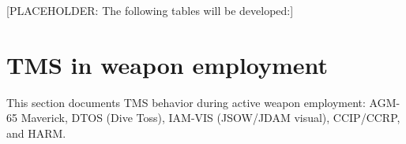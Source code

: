 \documentclass[11pt, a4paper, twoside]{report}
\newenvironment{hotastable}[1]{%
	\footnotesize
	\setlength{\tabcolsep}{3pt}
	\renewcommand{\arraystretch}{1.35}
	\begin{longtable}{L{1.00cm} L{0.90cm} L{0.90cm} L{3.30cm} L{6.40cm} L{1.40cm} L{1.60cm}}
		\caption{#1}\label{table.\thetable}\\
		\noalign{\addtocontents{hotas}{\protect\contentsline{table}{\protect\numberline{\thetable}#1}{\thepage}{table.\thetable}}}%
		\rowcolor{headerblue}
		\multicolumn{1}{>{\centering\arraybackslash}p{1.00cm}}{\textbf{\color{white}Mode}} &
		\multicolumn{1}{>{\centering\arraybackslash}p{0.90cm}}{\textbf{\color{white}Dir.}} &
		\multicolumn{1}{>{\centering\arraybackslash}p{0.90cm}}{\textbf{\color{white}Act.}} &
		\multicolumn{1}{>{\centering\arraybackslash}p{3.30cm}}{\textbf{\color{white}Function}} &
		\multicolumn{1}{>{\centering\arraybackslash}p{6.40cm}}{\textbf{\color{white}Effect / Nuance}} &
		\multicolumn{1}{>{\centering\arraybackslash}p{1.40cm}}{\textbf{\color{white}Dash34}} &
		\multicolumn{1}{>{\centering\arraybackslash}p{1.60cm}}{\textbf{\color{white}Train.}} \\
		\endfirsthead
		\rowcolor{headerblue}
		\multicolumn{1}{>{\centering\arraybackslash}p{1.00cm}}{\textbf{\color{white}Mode}} &
		\multicolumn{1}{>{\centering\arraybackslash}p{0.90cm}}{\textbf{\color{white}Dir.}} &
		\multicolumn{1}{>{\centering\arraybackslash}p{0.90cm}}{\textbf{\color{white}Act.}} &
		\multicolumn{1}{>{\centering\arraybackslash}p{3.30cm}}{\textbf{\color{white}Function}} &
		\multicolumn{1}{>{\centering\arraybackslash}p{6.40cm}}{\textbf{\color{white}Effect / Nuance}} &
		\multicolumn{1}{>{\centering\arraybackslash}p{1.40cm}}{\textbf{\color{white}Dash34}} &
		\multicolumn{1}{>{\centering\arraybackslash}p{1.60cm}}{\textbf{\color{white}Train.}} \\
		\endhead
		\multicolumn{7}{r}{\small\emph{Continued on next page}}\\
		\endfoot
		\endlastfoot
	}{%
	\end{longtable}
}
\begin{document}
[PLACEHOLDER: The following tables will be developed:]




\newpage
\section{TMS in weapon employment}
\label{sec:C4-S5}

This section documents TMS behavior during active weapon employment: AGM-65 Maverick, DTOS (Dive Toss), IAM-VIS (JSOW/JDAM visual), CCIP/CCRP, and HARM.
\end{document}
